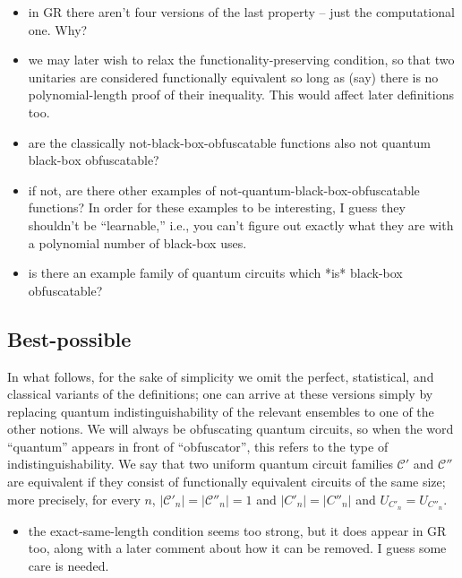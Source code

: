 \documentclass[11pt]{article}
\numberwithin{equation}{section}
\begin{document}
\begin{itemize}
\item in GR there aren't four versions of the last property -- just the computational one. Why?
\item we may later wish to relax the functionality-preserving condition, so that two unitaries are considered functionally equivalent so long as (say) there is no polynomial-length proof of their inequality. This would affect later definitions too.
\item are the classically not-black-box-obfuscatable functions also not quantum black-box obfuscatable?
\item if not, are there other examples of not-quantum-black-box-obfuscatable functions? In order for these examples to be interesting, I guess they shouldn't be ``learnable,'' i.e., you can't figure out exactly what they are with a polynomial number of black-box uses.
\item is there an example family of quantum circuits which *is* black-box obfuscatable?
\end{itemize}

\subsection{Best-possible}

In what follows, for the sake of simplicity we omit the perfect, statistical, and classical variants of the definitions; one can arrive at these versions simply by replacing quantum indistinguishability of the relevant ensembles to one of the other notions. We will always be obfuscating quantum circuits, so when the word ``quantum'' appears in front of ``obfuscator'', this refers to the type of indistinguishability. We say that two uniform quantum circuit families $\mathcal C'$ and $\mathcal C''$ are equivalent if they consist of functionally equivalent circuits of the same size; more precisely, for every $n$, $|\mathcal C'_n| = |\mathcal C''_n| = 1$ and $|C'_n| = |C''_n|$  and $U_{C'_n} = U_{C''_n}$.

\begin{itemize}
\item the exact-same-length condition seems too strong, but it does appear in GR too, along with a later comment about how it can be removed. I guess some care is needed.
\end{itemize}
\end{document}
